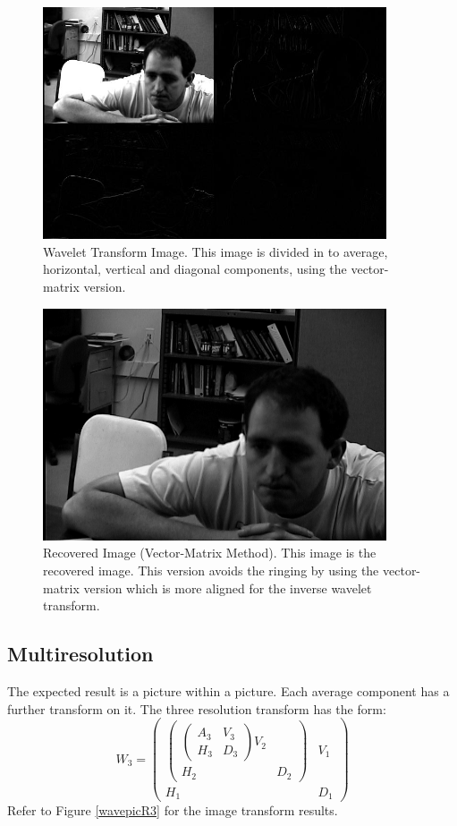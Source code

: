 \begin{figure}[htb]
\begin{center}
\includegraphics [width=4in]{selfWavepic.jpg}
\end{center}
\caption{Wavelet Transform Image.  This image is divided in to average, horizontal, vertical and diagonal components, using the vector-matrix version. }
\label{wavepic}
\end{figure}

\begin{figure}[htb]
\begin{center}
\includegraphics [width=4in]{selfRecover.jpg}
\end{center}
\caption{Recovered Image (Vector-Matrix Method).  This image is the recovered image.  This version avoids the ringing by using the vector-matrix version which is more aligned for the inverse wavelet transform.  }
\label{selfRecover}
\end{figure}

\subsection {Multiresolution}
The expected result is a picture within a picture.  Each average component has a further transform on it.  The three resolution transform has the form:
\[
W_3 = 
\left(
\begin{array}{cc}
\left(
\begin{array}{cc}
\left(
\begin{array}{cc}
A_3& V_3 \\ 
H_3 & D_3
\end{array} 
\right)
V_2 \\ 
H_2 & D_2
\end{array}
\right)
 & V_1 \\ 
H_1 & D_1
\end{array}
\right)
\]
Refer to Figure \ref{wavepicR3} for the image transform results.  

